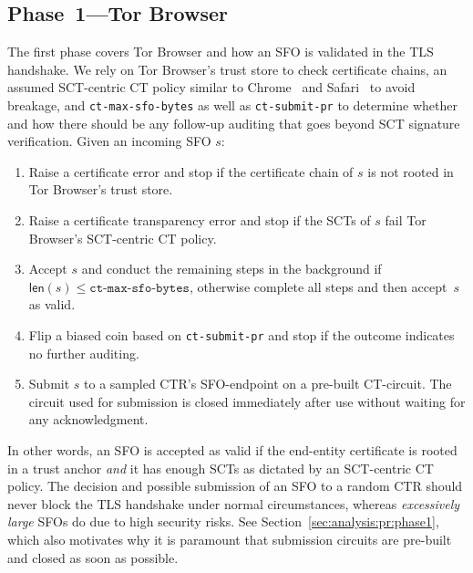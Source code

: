 \subsection{Phase~1---Tor Browser} \label{sec:base:phase1}
The first phase covers Tor Browser and how an SFO is validated in the TLS
handshake.  We rely on Tor Browser's trust store to check certificate chains, an
assumed SCT-centric CT policy similar to Chrome~\cite{chrome-policy} and
Safari~\cite{safari-policy} to avoid breakage, and \texttt{ct-max-sfo-bytes} as
well as \texttt{ct-submit-pr} to determine whether and how there should be any
follow-up auditing that goes beyond SCT signature verification.  Given an
incoming SFO $s$:

\begin{enumerate}
	\item Raise a certificate error and stop if the certificate chain of $s$
		is not rooted in Tor Browser's trust store.
	\item Raise a certificate transparency error and stop if the SCTs of $s$
		fail Tor Browser's SCT-centric CT policy.
	\item Accept $s$ and conduct the remaining steps in the background if
		$\mathsf{len}(s) \le \texttt{ct-max-sfo-bytes}$, otherwise complete
		all steps and then accept~$s$ as valid.
	\item Flip a biased coin based on \texttt{ct-submit-pr} and stop if the
		outcome indicates no further auditing.
	\item Submit $s$ to a sampled CTR's SFO-endpoint on a pre-built CT-circuit.
		The circuit used for submission is closed immediately after use without
		waiting for any acknowledgment.
\end{enumerate}

In other words, an SFO is accepted as valid if the end-entity certificate is
rooted in a trust anchor \emph{and} it has enough SCTs as dictated by an
SCT-centric CT policy.  The decision and possible submission of an SFO to a
random CTR should never block the TLS handshake under normal circumstances,
whereas \emph{excessively large} SFOs do due to high security risks.  See
Section~\ref{sec:analysis:pr:phase1}, which also motivates why it is paramount
that submission circuits are pre-built and closed as soon as possible.

%
%

